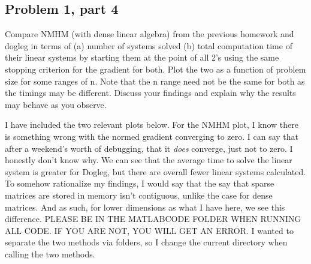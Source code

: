 \newpage
\subsection{Problem 1, part 4}
 Compare NMHM (with dense linear algebra) from the previous homework and dogleg in terms of (a) number of systems solved (b) total computation time of their linear systems by starting them at the point of all 2's using the same stopping criterion for the gradient for both. Plot the two as a function of problem size for some ranges of n. Note that the n range need not be the same for both as the timings may be different. Discuss your findings and explain why the results may behave as you observe. 
 \partbreak
 \begin{solution}

     I have included the two relevant plots below. For the NMHM plot, I know there is something wrong with the normed gradient converging to zero. I can say that after a weekend's worth of debugging, that it \textit{does} converge, just not to zero. I honestly don't know why. We can see that the average time to solve the linear system is greater for Dogleg, but there are overall fewer linear systems calculated. To somehow rationalize my findings, I would say that the say that sparse matrices are stored in memory isn't contiguous, unlike the case for dense matrices. And as such, for lower dimensions as what I have here, we see this difference. PLEASE BE IN THE MATLABCODE FOLDER WHEN RUNNING ALL CODE. IF YOU ARE NOT, YOU WILL GET AN ERROR. I wanted to separate the two methods via folders, so I change the current directory when calling the two methods. 
 \end{solution}

